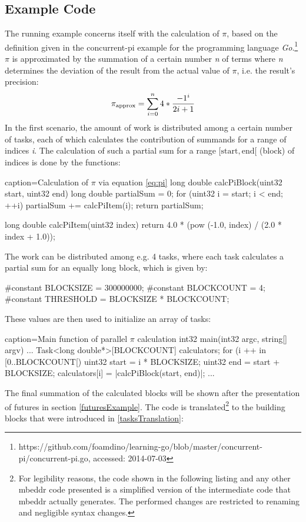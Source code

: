 \subsection{Example Code}
\label{taskExample}
The running example concerns itself with the calculation of $\pi$, based on the definition given in the concurrent-pi example for the programming language \textit{Go}.\footnote{https://github.com/foamdino/learning-go/blob/master/concurrent-pi/concurrent-pi.go, accessed: 2014-07-03} $\pi$ is approximated by the summation of a certain number \textit{n} of terms where \textit{n} determines the deviation of the result from the actual value of $\pi$, i.e. the result's precision: 
\begin{equation}\label{eq:pi}
{\pi}_{\mathrm{approx}} = \sum\limits_{i=0}^{n}4*{-1^i \over 2i+1}
\end{equation}
In the first scenario, the amount of work is distributed among a certain number of tasks, each of which calculates the contribution of summands for a range of indices \textit{i}. The calculation of such a partial sum for a range $[\mathrm{start}, \mathrm{end}[$ (block) of indices is done by the functions:
\begin{ccode}{caption=Calculation of $\pi$ via equation \ref{eq:pi}}
long double calcPiBlock(uint32 start, uint32 end) { 
  long double partialSum = 0; 
  for (uint32 i = start; i < end; ++i) { partialSum += calcPiItem(i); }
  return partialSum; 
}
 
long double calcPiItem(uint32 index) { 
  return 4.0 * (pow (-1.0, index) / (2.0 * index + 1.0)); 
}
\end{ccode}
The work can be distributed among e.g. 4 tasks, where each task calculates a partial sum for an equally long block, which is given by:
\begin{ccode}{}
#constant BLOCKSIZE = 300000000;
#constant BLOCKCOUNT = 4; 
#constant THRESHOLD = BLOCKSIZE * BLOCKCOUNT;
\end{ccode}
These values are then used to initialize an array of tasks:
\begin{ccode}{caption=Main function of parallel $\pi$ calculation}
int32 main(int32 argc, string[] argv) {
  ...
  Task<long double*>[BLOCKCOUNT] calculators;
  for (i ++ in [0..BLOCKCOUNT[) { 
    uint32 start = i * BLOCKSIZE; 
    uint32 end = start + BLOCKSIZE; 
    calculators[i] = |calcPiBlock(start, end)|; 
  } ...
}
\end{ccode}
The final summation of the calculated blocks will be shown after the presentation of futures in section \ref{futuresExample}. The code is translated\footnote{For legibility reasons, the code shown in the following listing and any other mbeddr code presented is a simplified version of the intermediate code that mbeddr actually generates. The performed changes are restricted to renaming and negligible syntax changes.} to the building blocks that were introduced in \ref{tasksTranslation}:
